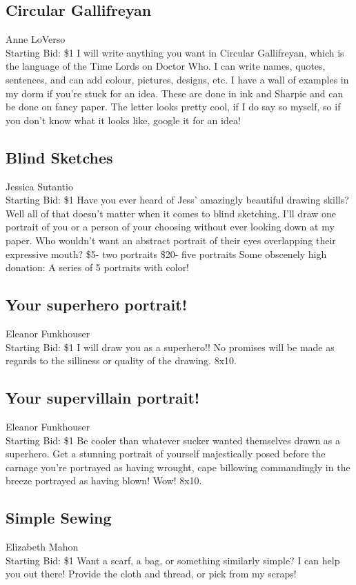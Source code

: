 \documentclass[11pt]{article}
\begin{document}
\subsection{Circular Gallifreyan}
Anne LoVerso
\\
Starting Bid: \$1
\newline
I will write anything you want in Circular Gallifreyan, which is the language of the Time Lords on Doctor Who.  I can write names, quotes, sentences, and can add colour, pictures, designs, etc.  I have a wall of examples in my dorm if you're stuck for an idea.
These are done in ink and Sharpie and can be done on fancy paper.
The letter looks pretty cool, if I do say so myself, so if you don't know what it looks like, google it for an idea!
\subsection{Blind Sketches}
Jessica Sutantio
\\
Starting Bid: \$1
\newline
Have you ever heard of Jess' amazingly beautiful drawing skills? Well all of that doesn't matter when it comes to blind sketching. I'll draw one portrait of you or a person of your choosing without ever looking down at my paper. Who wouldn't want an abstract portrait of their eyes overlapping their expressive mouth?
\$5- two portraits
\$20- five portraits
Some obscenely high donation: A series of 5 portraits with color!
\subsection{Your superhero portrait!}
Eleanor Funkhouser
\\
Starting Bid: \$1
\newline
I will draw you as a superhero!! No promises will be made as regards to the silliness or quality of the drawing. 8x10.
\subsection{Your supervillain portrait!}
Eleanor Funkhouser
\\
Starting Bid: \$1
\newline
Be cooler than whatever sucker wanted themselves drawn as a superhero. Get a stunning portrait of yourself majestically posed before the carnage you're portrayed as having wrought, cape billowing commandingly in the breeze portrayed as having blown! Wow! 8x10.
\subsection{Simple Sewing}
Elizabeth Mahon
\\
Starting Bid: \$1
\newline
Want a scarf, a bag, or something similarly simple? I can help you out there! Provide the cloth and thread, or pick from my scraps!
\end{document}
